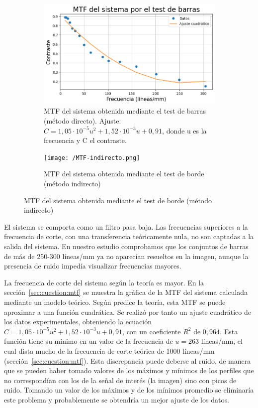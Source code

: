 \documentclass{./packages/optica-article}
\begin{document}
\begin{figure}
\begin{subfigure}[t]{0.48\textwidth}
	\centering
	\includegraphics[width=\textwidth]{MTF-directo.png}
	\caption{MTF del sistema obtenida mediante el test de barras (método directo). Ajuste: $C = 1,05 \cdot 10^{-5} u^2 + 1,52 \cdot 10^{-3} u + 0,91$, donde u es la frecuencia y C el contraste.}
	\label{fig:mtf-directo}
\end{subfigure}
\quad
\begin{subfigure}[t]{0.48\textwidth}
	\centering
	\texttt{[image: /MTF-indirecto.png]}
	\caption{MTF del sistema obtenida mediante el test de borde (método indirecto)}
	\label{fig:mtf-indirecto}
\end{subfigure}
\end{figure}


El sistema se comporta como un filtro pasa baja. Las frecuencias superiores a la frecuencia de corte, con una transferencia teóricamente nula, no son captadas a la salida del sistema. En nuestro estudio comprobamos que los conjuntos de barras de más de 250-300 líneas/mm ya no aparecían resueltos en la imagen, aunque la presencia de ruido impedía visualizar frecuencias mayores.

La frecuencia de corte del sistema según la teoría es mayor. En la sección~\ref{sec:cuestion:mtf} se muestra la gráfica de la MTF del sistema calculada mediante un modelo teórico. Según predice la teoría, esta MTF se puede aproximar a una función cuadrática. Se realizó por tanto un ajuste cuadrático de los datos experimentales, obteniendo la ecuación $C = 1,05 \cdot 10^{-5} u^2 + 1,52 \cdot 10^{-3} u + 0,91$, con un coeficiente $R^2$ de $0,964$. Esta función tiene su mínimo en un valor de la frecuencia de $u = 263$ líneas/mm, el cual dista mucho de la frecuencia de corte teórica de 1000 líneas/mm (sección~\ref{sec:cuestion:mtf}). Esta discrepancia puede deberse al ruido, de manera que se pueden haber tomado valores de los máximos y mínimos de los perfiles que no correspondían con los de la señal de interés (la imagen) sino con picos de ruido. Tomando un valor de los máximos y de los mínimos promedio se eliminaría este problema y probablemente se obtendría un mejor ajuste de los datos.
\end{document}

